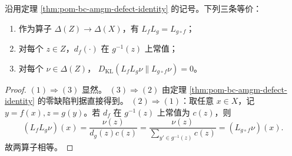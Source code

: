 \begin{corollary}[均匀提升函子性的充要判据]\label{cor:pom-bc-functoriality-criterion}
沿用定理 \ref{thm:pom-bc-amgm-defect-identity} 的记号。下列三条等价：
\begin{enumerate}
  \item 作为算子 \(\Delta(Z)\to\Delta(X)\)，有 \(L_fL_g=L_{g\circ f}\)；
  \item 对每个 \(z\in Z\)，\(d_f(\cdot)\) 在 \(g^{-1}(z)\) 上常值；
  \item 对每个 \(\nu\in\Delta(Z)\)，
  \(D_{\mathrm{KL}}(L_fL_g\nu\|L_{g\circ f}\nu)=0\)。
\end{enumerate}
\end{corollary}
\begin{proof}
\((1)\Rightarrow(3)\) 显然。
\((3)\Rightarrow(2)\) 由定理 \ref{thm:pom-bc-amgm-defect-identity} 的零缺陷判据直接得到。
\((2)\Rightarrow(1)\)：取任意 \(x\in X\)，记 \(y=f(x),z=g(y)\)。若 \(d_f\) 在 \(g^{-1}(z)\) 上常值为 \(c(z)\)，则
\[
(L_fL_g\nu)(x)=\frac{\nu(z)}{d_g(z)c(z)}
=\frac{\nu(z)}{\sum_{y'\in g^{-1}(z)}c(z)}
=(L_{g\circ f}\nu)(x).
\]
故两算子相等。
\end{proof}

